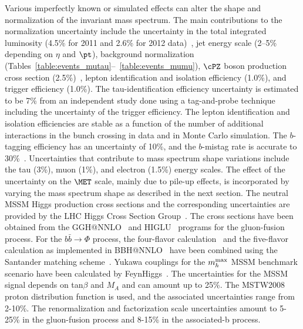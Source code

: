 Various imperfectly known or simulated effects can alter the shape and normalization of the invariant mass spectrum. The main contributions to the normalization uncertainty include the uncertainty in the total integrated luminosity (4.5\% for 2011 and 2.6\% for 2012 data)~\cite{CMS-LUMI}, jet energy scale (2--5\% depending on $\eta$ and $\pt$), background normalization
(Tables~\ref{table:events_mutau}--~\ref{table:events_mumu}), $\cPZ$ boson production cross section (2.5\%)~\cite{CMS-EWK-WZ}, lepton identification and isolation efficiency (1.0\%), and trigger efficiency (1.0\%). The tau-identification efficiency uncertainty is estimated to be 7\% from an independent study done using a tag-and-probe technique~\cite{CMS-EWK-WZ} including the uncertainty of the trigger efficiency. The lepton identification and isolation efficiencies are stable as a function of the number of additional interactions in the bunch crossing in data and in Monte Carlo simulation. The $b$-tagging efficiency has an uncertainty of 10\%, and the $b$-mistag rate is accurate to 30\%~\cite{BTV-11-004}. Uncertainties that contribute to mass spectrum shape variations include the tau (3\%), muon (1\%), and electron (1.5\%) energy scales.
The effect of the uncertainty on the $\MET$ scale, mainly due to pile-up effects, is incorporated by varying the mass spectrum shape as described in the next section.
The neutral MSSM Higgs production cross sections and the corresponding uncertainties are provided by the LHC Higgs Cross Section Group~\cite{LHCHiggsCrossSectionWorkingGroup:2011ti}. The cross sections have been obtained from the GGH@NNLO~\cite{Harlander:2002wh,Anastasiou:2002yz,Ravindran:2003um,Harlander:2002vv,Anastasiou:2002wq} and HIGLU~\cite{Spira:1995rr,Spira:1995mt} programs for the gluon-fusion process. For the $b\bar{b}\to\Phi$ process, the four-flavor calculation~\cite{Dittmaier:2003ej,Dawson:2003kb} and the five-flavor calculation as implemented in BBH@NNLO~\cite{Harlander:2003ai} have been combined using the Santander matching scheme~\cite{Santander}. 
Yukawa couplings for the $m_{h}^{\rm max}$ MSSM benchmark scenario have been calculated by FeynHiggs~\cite{Heinemeyer:1998yj,Heinemeyer:1998np,Degrassi:2002fi}.
The uncertainties for the MSSM signal depends on tan$\beta$ and $M_{A}$ and can amount up to 25\%. The MSTW2008 proton distribution function is used, and the associated uncertainties range from 2-10\%. The renormalization and factorization scale uncertainties amount to 5-25\% in the gluon-fusion process and 8-15\% in the associated-b process. 


